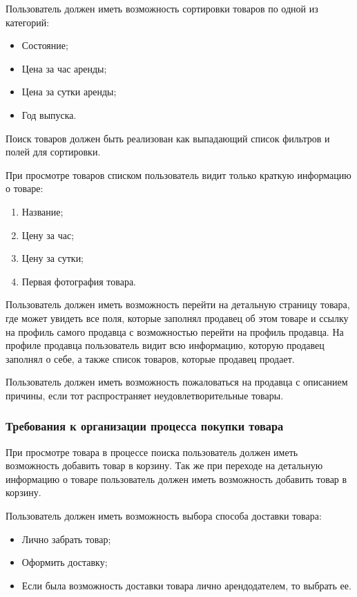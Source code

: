 Пользователь должен иметь возможность сортировки товаров по одной из категорий:
\begin{itemize}
    \item Состояние;
    \item Цена за час аренды;
    \item Цена за сутки аренды;
    \item Год выпуска.
\end{itemize}

Поиск товаров должен быть реализован как выпадающий список фильтров и полей для сортировки.

При просмотре товаров списком пользователь видит только краткую информацию о товаре:
\begin{enumerate}
    \item Название;
    \item Цену за час;
    \item Цену за сутки;
    \item Первая фотография товара.
\end{enumerate}

Пользователь должен иметь возможность перейти на детальную страницу товара, где может увидеть все поля, которые заполнял продавец об этом товаре и ссылку на профиль самого продавца с возможностью перейти на профиль продавца.
На профиле продавца пользователь видит всю информацию, которую продавец заполнял о себе, а также список товаров, которые продавец продает.

Пользователь должен иметь возможность пожаловаться на продавца с описанием причины, если тот распространяет неудовлетворительные товары.

\subsubsection{Требования к организации процесса покупки товара}\hfill

При просмотре товара в процессе поиска пользователь должен иметь возможность добавить товар в корзину.
Так же при переходе на детальную информацию о товаре пользователь должен иметь возможность добавить товар в корзину.

Пользователь должен иметь возможность выбора способа доставки товара:
\begin{itemize}
    \item Лично забрать товар;
    \item Оформить доставку;
    \item Если была возможность доставки товара лично арендодателем, то выбрать ее.
\end{itemize}


